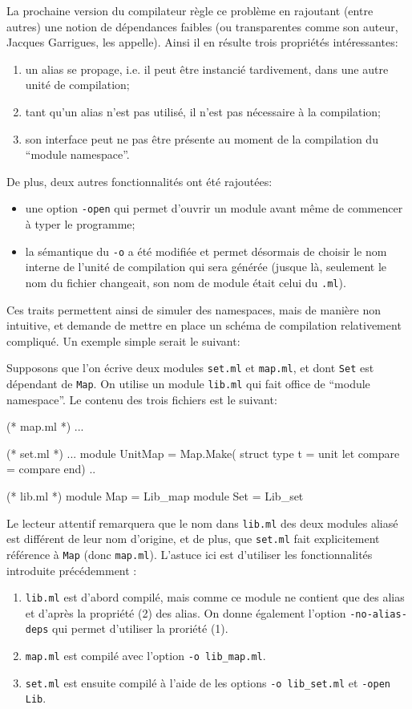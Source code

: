 \documentclass[11pt,a4paper]{report}
\begin{document}
La prochaine version du compilateur règle ce problème en rajoutant (entre
autres) une notion de dépendances faibles (ou transparentes comme son auteur,
Jacques Garrigues, les appelle). Ainsi il en résulte trois propriétés
intéressantes:
\begin{enumerate}
\item un alias se propage, i.e. il peut être instancié tardivement, dans une
  autre unité de compilation;
\item tant qu'un alias n'est pas utilisé, il n'est pas nécessaire à la
  compilation; 
\item son interface peut ne pas être présente au moment de la compilation du
  ``module namespace''.
\end{enumerate}
De plus, deux autres fonctionnalités ont été rajoutées:
\begin{itemize}
\item une option \texttt{-open} qui permet d'ouvrir un module avant même de
  commencer à typer le programme;
\item la sémantique du \texttt{-o} a été modifiée et permet désormais de choisir
  le nom interne de l'unité de compilation qui sera générée (jusque là,
  seulement le nom du fichier changeait, son nom de module était celui du
  \texttt{.ml}).
\end{itemize}

Ces traits permettent ainsi de simuler des namespaces, mais de manière non
intuitive, et demande de mettre en place un schéma de compilation relativement
compliqué. Un exemple simple serait le suivant:

Supposons que l'on écrive deux modules \texttt{set.ml} et \texttt{map.ml}, et
dont \texttt{Set} est dépendant de \texttt{Map}. On utilise un module
\texttt{lib.ml} qui fait office de ``module namespace''. Le contenu des trois
fichiers est le suivant:

\begin{OCaml}
(* map.ml *)
...

(* set.ml *)
...
module UnitMap = Map.Make(
  struct 
    type t = unit 
    let compare = compare 
  end)
..

(* lib.ml *)
module Map = Lib_map
module Set = Lib_set
\end{OCaml}

Le lecteur attentif remarquera que le nom dans \texttt{lib.ml} des deux modules
aliasé est différent de leur nom d'origine, et de plus, que \texttt{set.ml} fait
explicitement référence à \texttt{Map} (donc \texttt{map.ml}). L'astuce ici est
d'utiliser les fonctionnalités introduite précédemment :
\begin{enumerate}
\item \texttt{lib.ml} est d'abord compilé, mais comme ce module ne contient que
  des alias et d'après la propriété (2) des alias. On donne également l'option
  \texttt{-no-alias-deps} qui permet d'utiliser la proriété (1).
\item \texttt{map.ml} est compilé avec l'option \texttt{-o lib\_map.ml}.
\item \texttt{set.ml} est ensuite compilé à l'aide de les options \texttt{-o
  lib\_set.ml} et \texttt{-open Lib}.
\end{enumerate}
\end{document}
